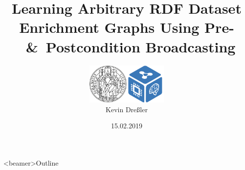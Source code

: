\documentclass[aspectratio=1610]{beamer}
\begin{document}
\title{Learning Arbitrary RDF Dataset Enrichment Graphs Using Pre-~\&~Postcondition Broadcasting}
\author{\includegraphics[height=2cm]{gfx/uni_leipzig_logo}\qquad\includegraphics[height=2cm]{gfx/dice_logo.png}\\\medskip \medskip Kevin Dreßler}
\date{15.02.2019}

{  
\frame{\titlepage}
}
\addtocounter{framenumber}{-1}

{  
\begin{frame}<beamer>{Outline}
    \tableofcontents
\end{frame}
}
\addtocounter{framenumber}{-1}


\end{document}
